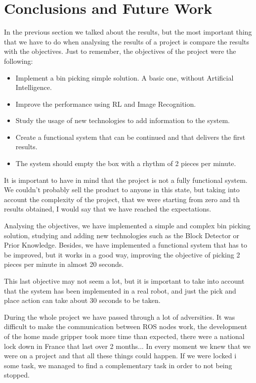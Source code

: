 \chapter{Conclusions and Future Work}

	In  the previous section we talked about the results, but the most important thing that we have to do when analysing the results of a project is compare the results with the objectives. Just to remember, the objectives of the project were the following:
	
	\begin{itemize}
		\item[\textendash]Implement a bin picking simple solution. A basic one, without Artificial Intelligence.
		\item[\textendash]Improve the performance using RL and Image Recognition.
		\item[\textendash]Study the usage of new technologies to add information to the system. 
		\item[\textendash]Create a functional system that can be continued and that delivers the first results.
		\item[\textendash]The system should empty the box with a rhythm of 2 pieces per minute.
	\end{itemize}
	
	It is important to have in mind that the project is not a fully functional system. We couldn't probably sell the product to anyone in this state, but taking into account the complexity of the project, that we were starting from zero and th results obtained, I would say that we have reached the expectations.
	
	Analysing the objectives, we have implemented a simple and complex bin picking solution, studying and adding new technologies such as the Block Detector or Prior Knowledge. Besides, we have implemented a functional system that has to be improved, but it works in a good way, improving the objective of picking 2 pieces per minute in almost 20 seconds. 
	
	This last objective may not seem a lot, but it is important to take into account that the system has been implemented in a real robot, and just the pick and place action can take about 30 seconds to be taken.
	
	During the whole project we have passed through a lot of adversities. It was difficult to make the communication between ROS nodes work, the development of the home made gripper took more time than expected, there were a national lock down in France that last over 2 months... In every moment we knew that we were on a project and that all these things could happen. If we were locked i some task, we managed to find a complementary task in order to not being stopped.
	
